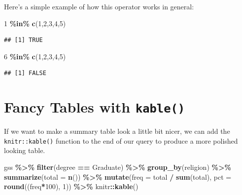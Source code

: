 \documentclass[
]{book}
\newenvironment{Shaded}{\begin{snugshade}}{\end{snugshade}}
\newcommand{\AttributeTok}[1]{\textcolor[rgb]{0.13,0.29,0.53}{#1}}
\newcommand{\DecValTok}[1]{\textcolor[rgb]{0.00,0.00,0.81}{#1}}
\newcommand{\FunctionTok}[1]{\textcolor[rgb]{0.13,0.29,0.53}{\textbf{#1}}}
\newcommand{\NormalTok}[1]{#1}
\newcommand{\SpecialCharTok}[1]{\textcolor[rgb]{0.81,0.36,0.00}{\textbf{#1}}}
\newcommand{\StringTok}[1]{\textcolor[rgb]{0.31,0.60,0.02}{#1}}
\begin{document}
Here's a simple example of how this operator works in general:

\begin{Shaded}
\begin{Highlighting}[]
\DecValTok{1} \SpecialCharTok{\%in\%} \FunctionTok{c}\NormalTok{(}\DecValTok{1}\NormalTok{,}\DecValTok{2}\NormalTok{,}\DecValTok{3}\NormalTok{,}\DecValTok{4}\NormalTok{,}\DecValTok{5}\NormalTok{)}
\end{Highlighting}
\end{Shaded}

\begin{verbatim}
## [1] TRUE
\end{verbatim}

\begin{Shaded}
\begin{Highlighting}[]
\DecValTok{6} \SpecialCharTok{\%in\%} \FunctionTok{c}\NormalTok{(}\DecValTok{1}\NormalTok{,}\DecValTok{2}\NormalTok{,}\DecValTok{3}\NormalTok{,}\DecValTok{4}\NormalTok{,}\DecValTok{5}\NormalTok{)}
\end{Highlighting}
\end{Shaded}

\begin{verbatim}
## [1] FALSE
\end{verbatim}

\hypertarget{fancy-tables-with-kable}{%
\section{\texorpdfstring{Fancy Tables with \texttt{kable()}}{Fancy Tables with kable()}}\label{fancy-tables-with-kable}}

If we want to make a summary table look a little bit nicer, we can add the \texttt{knitr::kable()} function to the end of our query to produce a more polished looking table.

\begin{Shaded}
\begin{Highlighting}[]
\NormalTok{gss }\SpecialCharTok{\%\textgreater{}\%}
  \FunctionTok{filter}\NormalTok{(degree }\SpecialCharTok{==} \StringTok{\textquotesingle{}Graduate\textquotesingle{}}\NormalTok{) }\SpecialCharTok{\%\textgreater{}\%}
  \FunctionTok{group\_by}\NormalTok{(religion) }\SpecialCharTok{\%\textgreater{}\%}
  \FunctionTok{summarize}\NormalTok{(}\AttributeTok{total =} \FunctionTok{n}\NormalTok{()) }\SpecialCharTok{\%\textgreater{}\%}
  \FunctionTok{mutate}\NormalTok{(}\AttributeTok{freq =}\NormalTok{ total }\SpecialCharTok{/} \FunctionTok{sum}\NormalTok{(total),}
         \AttributeTok{pct =} \FunctionTok{round}\NormalTok{((freq}\SpecialCharTok{*}\DecValTok{100}\NormalTok{), }\DecValTok{1}\NormalTok{)) }\SpecialCharTok{\%\textgreater{}\%}
\NormalTok{  knitr}\SpecialCharTok{::}\FunctionTok{kable}\NormalTok{()}
\end{Highlighting}
\end{Shaded}
\end{document}
